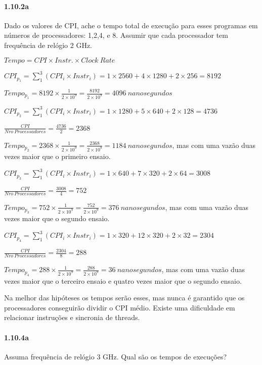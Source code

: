 \documentclass{article}
\begin{document}
\paragraph{1.10.2a} Dado os valores de CPI, ache o tempo total de execução para 
esses programas em números de processadores: 1,2,4, e 8. Assumir que cada 
processador tem frequência de relógio 2 GHz.

$Tempo = CPI \times Instr. \times Clock\ Rate$

$CPI_{p_{1}} = \sum_{1}^{3} (CPI_{i} \times Instr_{i}) =
1 \times 2560 + 4 \times 1280 + 2 \times 256 = 8192$

$Tempo_{p_{1}} = {8192} \times \frac{1}{2\times10^{9}} =
\frac{8192}{2\times10^{9}} = 4096\ nanosegundos$

$CPI_{p_{2}} = \sum_{1}^{3} (CPI_{i} \times Instr_{i}) =
1 \times 1280 + 5 \times 640 + 2 \times 128 = 4736$

$\frac{CPI}{Nro\ Processadores} = \frac{4736}{2} = 2368$

$Tempo_{p_{2}} = {2368} \times \frac{1}{2\times10^{9}} =
\frac{2368}{2\times10^{9}} = 1184\ nanosegundos$, mas com uma vazão duas vezes 
maior que o primeiro ensaio.

$CPI_{p_{3}} = \sum_{1}^{3} (CPI_{i} \times Instr_{i}) =
1 \times 640 + 7 \times 320 + 2 \times 64 = 3008$

$\frac{CPI}{Nro\ Processadores} = \frac{3008}{4} = 752$

$Tempo_{p_{3}} = {752} \times \frac{1}{2\times10^{9}} =
\frac{752}{2\times10^{9}} = 376\ nanosegundos$, mas com uma vazão duas vezes 
maior que o segundo ensaio.

$CPI_{p_{4}} = \sum_{1}^{3} (CPI_{i} \times Instr_{i}) =
1 \times 320 + 12 \times 320 + 2 \times 32 = 2304$

$\frac{CPI}{Nro\ Processadores} = \frac{2304}{8} = 288$

$Tempo_{p_{4}} = {288} \times \frac{1}{2\times10^{9}} =
\frac{288}{2\times10^{9}} = 36\ nanosegundos$, mas com uma vazão duas 
vezes maior que o terceiro ensaio e quatro vezes maior que o segundo ensaio.

Na melhor das hipóteses os tempos serão esses, mas nunca é garantido que os 
processadores conseguirão dividir o CPI médio. Existe uma dificuldade em 
relacionar instruções e sincronia de threads.

\paragraph{1.10.4a} Assuma frequência de relógio 3 GHz. Qual são os tempos de 
execuções?
\end{document}
